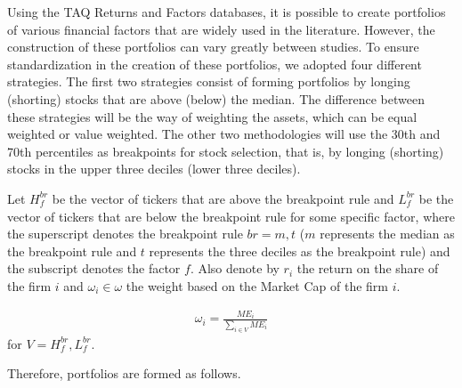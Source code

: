 Using the TAQ Returns and Factors databases, it is possible to create portfolios of various financial factors that are widely used in the literature. However, the construction of these portfolios can vary greatly between studies. To ensure standardization in the creation of these portfolios, we adopted four different strategies. The first two strategies consist of forming portfolios by longing (shorting) stocks that are above (below) the median. The difference between these strategies will be the way of weighting the assets, which can be equal weighted or value weighted. The other two methodologies will use the 30th and 70th percentiles as breakpoints for stock selection, that is, by longing (shorting) stocks in the upper three deciles (lower three deciles).

Let $H_{f}^{br}$ be the vector of tickers that are above the breakpoint rule and $L_{f}^{br}$ be the vector of tickers that are below the breakpoint rule for some specific factor, where the superscript denotes the breakpoint rule $br = m, t$ ($m$ represents the median as the breakpoint rule and $t$ represents the three deciles as the breakpoint rule) and the subscript denotes the factor $f$. Also denote by $r_i$ the return on the share of the firm $i$ and $\omega_i \in \omega$ the weight based on the Market Cap of the firm $i$.


\begin{align*}
	\omega_i = \frac{ME_i}{\sum_{i \in V} ME_i}
\end{align*}
for $V = H_{f}^{br}, L_{f}^{br}$.


Therefore, portfolios are formed as follows.


